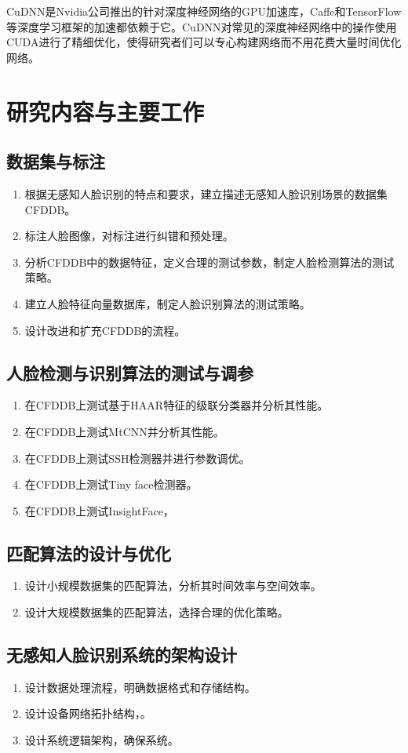 CuDNN\cite{chetlur2014cudnn}是Nvidia公司推出的针对深度神经网络的GPU加速库，Caffe和TensorFlow等深度学习框架的加速都依赖于它。CuDNN对常见的深度神经网络中的操作使用CUDA进行了精细优化，使得研究者们可以专心构建网络而不用花费大量时间优化网络。

\section{研究内容与主要工作}

\subsection{数据集与标注}

\begin{enumerate}
	\item 根据无感知人脸识别的特点和要求，建立描述无感知人脸识别场景的数据集CFDDB。
	\item 标注人脸图像，对标注进行纠错和预处理。
	\item 分析CFDDB中的数据特征，定义合理的测试参数，制定人脸检测算法的测试策略。
	\item 建立人脸特征向量数据库，制定人脸识别算法的测试策略。
	\item 设计改进和扩充CFDDB的流程。
\end{enumerate}

\subsection{人脸检测与识别算法的测试与调参}

\begin{enumerate}
	\item 在CFDDB上测试基于HAAR特征的级联分类器并分析其性能。
	\item 在CFDDB上测试MtCNN并分析其性能。
	\item 在CFDDB上测试SSH检测器并进行参数调优。
	\item 在CFDDB上测试Tiny face检测器。
	\item 在CFDDB上测试InsightFace，
\end{enumerate}

\subsection{匹配算法的设计与优化}

\begin{enumerate}
	\item 设计小规模数据集的匹配算法，分析其时间效率与空间效率。
	\item 设计大规模数据集的匹配算法，选择合理的优化策略。
\end{enumerate}

\subsection{无感知人脸识别系统的架构设计}

\begin{enumerate}
	\item 设计数据处理流程，明确数据格式和存储结构。
	\item 设计设备网络拓扑结构，。
	\item 设计系统逻辑架构，确保系统。
\end{enumerate}
